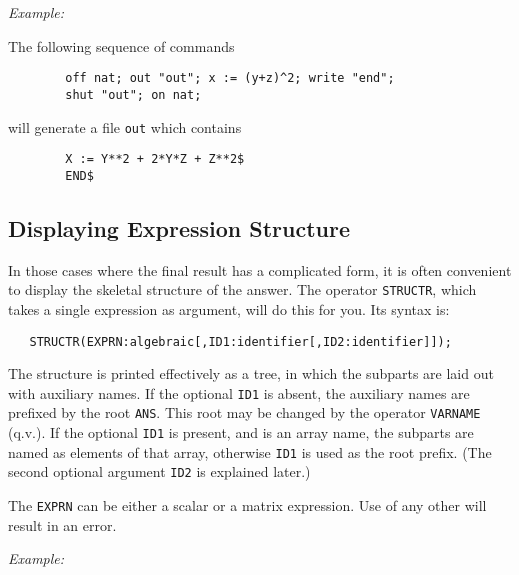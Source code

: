 {\it Example:}

The following sequence of commands
\begin{verbatim}
        off nat; out "out"; x := (y+z)^2; write "end";
        shut "out"; on nat;
\end{verbatim}
will generate a file {\tt out} which contains
\begin{verbatim}
        X := Y**2 + 2*Y*Z + Z**2$
        END$
\end{verbatim}

\subsection{Displaying Expression Structure}

In those cases where the final result has a complicated form, it is often
convenient to display the skeletal structure of the answer.  The operator
{\tt STRUCTR}, which takes a single expression as argument,
will do this for you.  Its syntax is:
\begin{verbatim}
   STRUCTR(EXPRN:algebraic[,ID1:identifier[,ID2:identifier]]);
\end{verbatim}
The structure is printed effectively as a tree, in which the subparts are
laid out with auxiliary names.  If the optional {\tt ID1} is absent, the
auxiliary names are prefixed by the root {\tt ANS}.  This root may be
changed by the operator {\tt VARNAME}  (q.v.).  If the
optional {\tt ID1} is present, and is an array name, the subparts are
named as elements of that array, otherwise {\tt ID1} is used as the root
prefix. (The second optional argument {\tt ID2} is explained later.)

The {\tt EXPRN} can be either a scalar or a matrix expression.  Use of any
other will result in an error.

{\it Example:}

